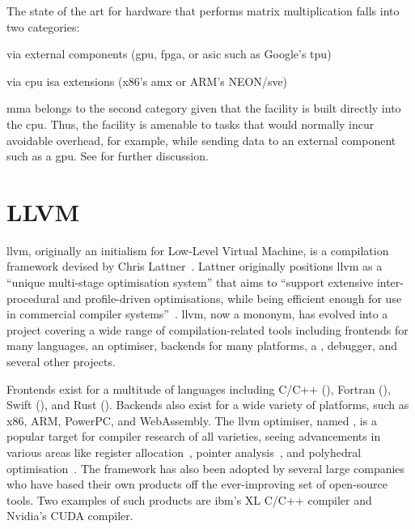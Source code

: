 \documentclass[\main/thesis.tex]{subfiles}
\begin{document}
The state of the art for hardware that performs matrix multiplication falls into two categories:
\begin{enumerate*}[itemjoin*={{ and }}, label=\textbf{(\arabic*)}, after={.}]
  \item via external components (\eg \gls{gpu}, \gls{fpga}, or \gls{asic} such as Google's \gls{tpu})
  \item via \gls{cpu} \gls{isa} extensions (\eg x86's \gls{amx} or ARM\textsuperscript{\textregistered{}}'s NEON\texttrademark{}/\gls{sve})
\end{enumerate*}
\Gls{mma} belongs to the second category given that the facility is built directly into the \gls{cpu}.
Thus, the facility is amenable to tasks that would normally incur avoidable overhead, for example, while sending data to an external component such as a \gls{gpu}.
See  for further discussion.

\section{LLVM}
\label{sec:llvm}
\Gls{llvm}, originally an initialism for Low-Level Virtual Machine, is a compilation framework devised by Chris Lattner~\autocite{lattner2002llvm,lattner2004llvm}.
Lattner originally positions \gls{llvm} as a ``unique multi-stage optimisation system'' that aims to ``support extensive inter-procedural and profile-driven optimisations, while being efficient enough for use in commercial compiler systems''~\autocite{lattner2002llvm}.
\Gls{llvm}, now a mononym, has evolved into a project covering a wide range of compilation-related tools including frontends for many languages, an optimiser, backends for many platforms, a , debugger, and several other projects.

Frontends exist for a multitude of languages including C/C++ (\texttrademark), Fortran (), Swift (), and Rust ().
Backends also exist for a wide variety of platforms, such as x86, ARM, PowerPC, and WebAssembly.
The \gls{llvm} optimiser, named , is a popular target for compiler research of all varieties, seeing advancements in various areas like register allocation~\autocite{lozano2019combinatorial,pereira2008register}, pointer analysis~\autocite{hardekopf2009semi,sui2016interprocedural}, and polyhedral optimisation~\autocite{grosser2011polly,alves2015runtime}.
The framework has also been adopted by several large companies who have based their own products off the ever-improving set of open-source tools.
Two examples of such products are \gls{ibm}'s XL C/C++ compiler and Nvidia's CUDA\textsuperscript{\textregistered{}} compiler.
\end{document}
